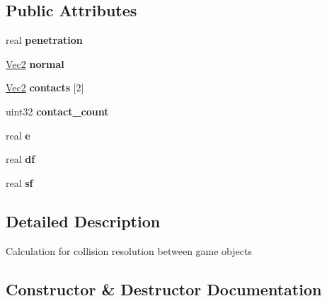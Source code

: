 \subsection*{Public Attributes}
\begin{DoxyCompactItemize}
\item 
\mbox{\label{class_manifold_a058391b5a2e745467c3da071408e631f}} 
real {\bfseries penetration}
\item 
\mbox{\label{class_manifold_a08837c3bbf15c2dd1cb51d984698ab46}} 
\mbox{\hyperlink{struct_vec2}{Vec2}} {\bfseries normal}
\item 
\mbox{\label{class_manifold_a0f3863f327800fdf7b5bfab8db88a6dc}} 
\mbox{\hyperlink{struct_vec2}{Vec2}} {\bfseries contacts} \mbox{[}2\mbox{]}
\item 
\mbox{\label{class_manifold_af98bbea7321829c3547ec8365f40f068}} 
uint32 {\bfseries contact\+\_\+count}
\item 
\mbox{\label{class_manifold_a7eb7fecdb3dbac0ad387ac9893f91180}} 
real {\bfseries e}
\item 
\mbox{\label{class_manifold_ac8b98d3211f99d8997b96a5c95ba80f1}} 
real {\bfseries df}
\item 
\mbox{\label{class_manifold_ad7ccd59e59bb27f236ea6a2d05a765e4}} 
real {\bfseries sf}
\end{DoxyCompactItemize}


\subsection{Detailed Description}
Calculation for collision resolution between game objects 



\subsection{Constructor \& Destructor Documentation}
\mbox{\label{class_manifold_a7a30f055ee040a7ac00284fb08b3c347}} 
